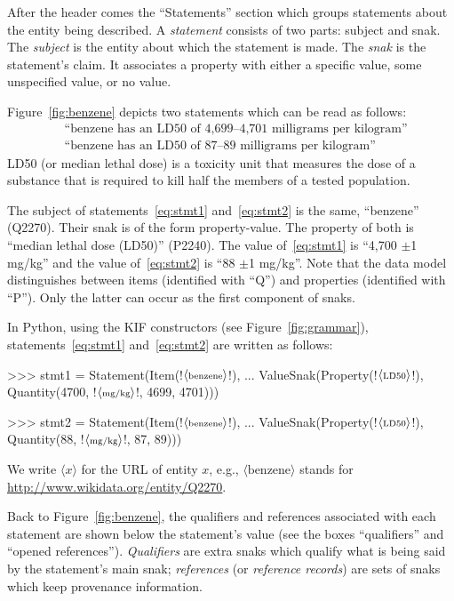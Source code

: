 After the header comes the ``Statements'' section which groups statements about the entity being described.
A \emph{statement} consists of two parts: subject and snak.
The \emph{subject} is the entity about which the statement is made.
The \emph{snak} is the statement's claim.
It associates a property with either a specific value, some unspecified value, or no value.


Figure~\ref{fig:benzene} depicts two statements which can be read as follows:
\begin{align}
  \label{eq:stmt1}
  &\text{``benzene has an LD50 of 4{,}699--4{,}701 milligrams per kilogram''}\\
  \label{eq:stmt2}
  &\text{``benzene has an LD50 of 87--89 milligrams per kilogram''}
\end{align}
LD50 (or median lethal dose) is a toxicity unit that measures the dose of a substance that is required to kill half the members of a tested population.


The subject of statements~\eqref{eq:stmt1} and~\eqref{eq:stmt2} is the same, ``benzene'' (Q2270).
Their snak is of the form property-value.
The property of both is ``median lethal dose (LD50)'' (P2240).
The value of~\eqref{eq:stmt1} is ``4{,}700 $\pm$1 mg/kg'' and the value of~\eqref{eq:stmt2} is ``88 $\pm$1 mg/kg''.
Note that the data model distinguishes between items (identified with ``Q'') and properties (identified with ``P'').
Only the latter can occur as the first component of snaks.


In Python, using the KIF constructors (see Figure~\ref{fig:grammar}), statements~\eqref{eq:stmt1} and~\eqref{eq:stmt2} are written as follows:
\newcommand*\X[1]{$\langle\text{\scriptsize{\textrm{#1}}}\rangle$}%
\begin{pyconcode}
>>> stmt1 = Statement(Item(!\X{benzene}!),
...    ValueSnak(Property(!\X{LD50}!), Quantity(4700, !\X{mg/kg}!, 4699, 4701)))

>>> stmt2 = Statement(Item(!\X{benzene}!),
...    ValueSnak(Property(!\X{LD50}!), Quantity(88, !\X{mg/kg}!, 87, 89)))
\end{pyconcode}
We write $\langle{x}\rangle$ for the URL of entity $x$, e.g., $\langle\text{benzene}\rangle$ stands for \url{http://www.wikidata.org/entity/Q2270}.


Back to Figure~\ref{fig:benzene}, the qualifiers and references associated with each statement are shown below the statement's value (see the boxes ``qualifiers'' and ``opened references'').
\emph{Qualifiers} are extra snaks which qualify what is being said by the statement's main snak; \emph{references} (or \emph{reference records}) are sets of snaks which keep provenance information.


